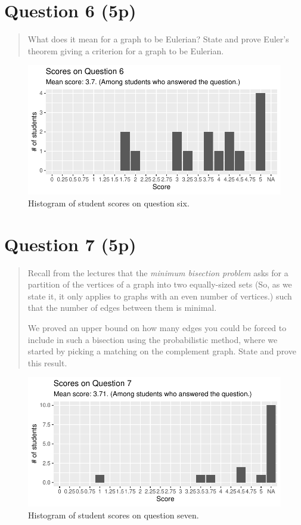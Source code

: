 \documentclass[nobib]{tufte-handout}
\begin{document}
\section{Question 6 (5p)} %

\begin{quotation}
  What does it mean for a graph to be Eulerian? State and prove Euler's theorem giving a criterion for a graph to be Eulerian.
\end{quotation}

\begin{figure}
  \centering
  \includegraphics[width = \textwidth]{Q6.pdf}
  \caption[Score histogram for Q6]{Histogram of student scores on question six.}
  \label{fig:Q6}
\end{figure}

\section{Question 7 (5p)} %

\begin{quotation}
  Recall from the lectures that the \emph{minimum bisection problem} asks for a partition of the vertices of a graph into two equally-sized sets (So, as we state it, it only applies to graphs with an even number of vertices.) such that the number of edges between them is minimal.

  We proved an upper bound on how many edges you could be forced to include in such a bisection using the probabilistic method, where we started by picking a matching on the complement graph. State and prove this result.
\end{quotation}

\begin{figure}
  \centering
  \includegraphics[width = \textwidth]{Q7.pdf}
  \caption[Score histogram for Q7]{Histogram of student scores on question seven.}
  \label{fig:Q7}
\end{figure}
\end{document}
